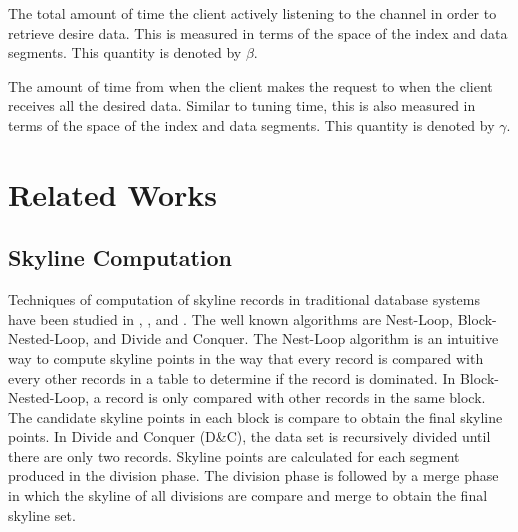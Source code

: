 \documentclass{sig-alternate}
\newenvironment{definition}[1][Definition]{\begin{trivlist}
\item[\hskip \labelsep {\bfseries #1}]}{\end{trivlist}}
\begin{document}
\begin{definition}[Tuning time]
The total amount of time the client actively listening to the channel in
order to retrieve desire data. This is measured in terms of the space of
the index and data segments.
This quantity is denoted by $\beta$.
\end{definition}

\begin{definition}[Access latency]
The amount of time from when the
client makes the request to when the client receives all the
desired data. Similar to tuning time, this is also measured in terms of
the space of the index and data segments.
This quantity is denoted by $\gamma$.
\end{definition}



\section{Related Works}\label{sec-related-works}


\subsection{Skyline Computation}
Techniques of computation of skyline records in traditional database systems have been studied
in \cite{skyline_operator}, \cite{shooting_stars}, and \cite{progressive_skyline}. The well known
algorithms are Nest-Loop, Block-Nested-Loop, and
Divide and Conquer. The Nest-Loop algorithm is an intuitive way to compute skyline points in
the way that every record is compared with every other records in a table to determine if the
record is dominated. In Block-Nested-Loop, a record is only compared with other records in the
same block. The candidate skyline points in each block is compare to obtain the final skyline
points. In Divide and Conquer (D\&C), the data set is recursively divided until there are only two
records. Skyline points are calculated for each segment produced in the division phase. The
division phase is followed by a merge phase in which the skyline of all divisions
are compare and merge to obtain the final skyline set.
\end{document}
